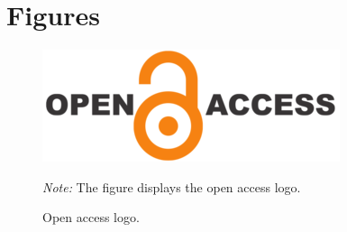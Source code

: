\setcounter{figure}{0}
\label{subsec:Figures}

\FloatBarrier
\newpage
\section*{Figures}

\begin{figure}[phtb] %
{ \centering
\includegraphics[width=\textwidth]{output/figures/open_access_logo.png}
\caption{Open access logo.} \label{fig:openaccesslogo}
}
{\indent \textit{Note:} The figure displays the open access logo.}
\end{figure}

\clearpage
